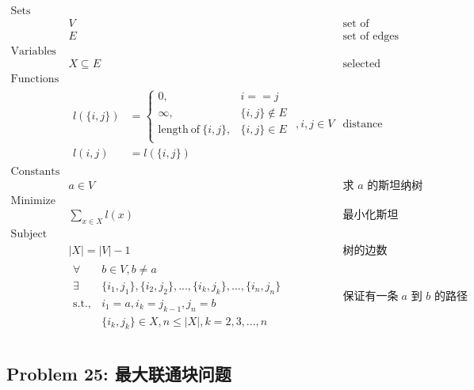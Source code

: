 \documentclass[11pt]{article}
\begin{document}
\begin{eqnarray*}
    \textrm{Sets} \\
        & V & \textrm{set of vertices} \\
        & E & \textrm{set of edges} \\
    \textrm{Variables} \\
        & X \subseteq E & \textrm{selected edges} \\
    \textrm{Functions} \\
        & \begin{array}{rl}
            l(\{i, j\}) &= \left\{
                \begin{array}{ll}
                    0,                              & i == j \\
                    \infty,                         & \{i, j\} \notin E \\
                    \mathrm{length\ of\ }\{i, j\},  & \{i, j\} \in E \\
                \end{array}
            \right. \\
            l(i, j) &= l(\{i, j\})
        \end{array}, i, j \in V & \textrm{distance between vertices} \\
    \textrm{Constants} \\
        & a \in V & \textrm{求 $a$ 的斯坦纳树} \\
    \textrm{Minimize} \\
        & \displaystyle \sum_{x \in X} l(x) & \textrm{最小化斯坦纳树路径长度} \\
    \textrm{Subject to} \\
        & |X| = |V| - 1 & \textrm{树的边数} \\
        & \begin{array}{rl}
            \forall & b \in V, b \neq a \\
            \exists & \{i_1, j_1\}, \{i_2, j_2\}, ..., \{i_k, j_k\}, ..., \{i_n, j_n\} \\
            \mathrm{s.t.,} & i_1 = a, i_k = j_{k-1}, j_n = b \\
                    & \{i_k, j_k\} \in X, n \leq |X|, k = 2, 3, ..., n
        \end{array} & \textrm{保证有一条 $a$ 到 $b$ 的路径} \\ 
\end{eqnarray*}


\newpage
\subsection*{Problem 25: 最大联通块问题}
\end{document}
